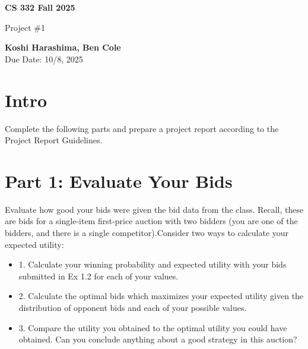 \documentclass[11pt]{article}
\begin{document}
\begin{titlepage}
   \begin{center}
       \vspace*{9cm}

       \textbf{CS 332 Fall 2025}

       \vspace{0.5cm}
        Project \#1
        \vfill

       \textbf{Koshi Harashima, Ben Cole}\\
       Due Date: 10/8, 2025
            
   \end{center}
\end{titlepage}

\section*{Intro}
Complete the following parts and prepare a project report according to the Project Report Guidelines.

\section*{Part 1: Evaluate Your Bids}
Evaluate how good your bids were given the bid data from the class.  Recall, these are bids for a single-item first-price auction with two bidders (you are one of the bidders, and there is a single competitor).Consider two ways to calculate your expected utility:

\begin{itemize}
    \begin{itemize}
        \item \textbf{Exact calculation}. \\You can write a simple formula that evaluates the winning probability for each bid you placed given that the competing bid is a uniform random bid from the bid data. 
        \item \textbf{Monte Carlo simulation}.\\You can simulate the auction many times and average the results.  In each simulation you draw a random bid from the competing bid distribution in the data.
        \item Compare using these two approaches for making the following calculations.  Note that the answer you get from "exact calculation" is the correct answer while the answer you get from Monte Carlo simulation is only an estimate that gets more accurate with longer simulations
    \end{itemize}
    \item 1. Calculate your winning probability and expected utility with your bids submitted in Ex 1.2 for each of your values.
    \item 2. Calculate the optimal bids which maximizes your expected utility given the distribution of opponent bids and each of your possible values.
    \item 3. Compare the utility you obtained to the optimal utility you could have obtained.  Can you conclude anything about a good strategy in this auction?
\end{itemize}
\end{document}
